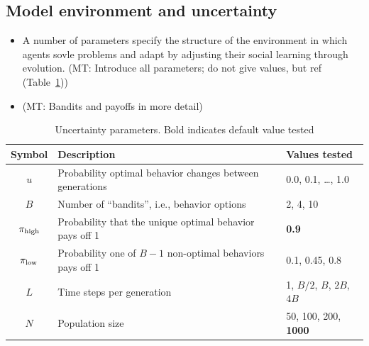 \documentclass[letterpaper,11.5pt]{scrartcl}
\newcommand{\mt}[1]{{\textcolor{myorange} {({\tiny MT:} #1)}}}
\begin{document}
\subsection{Model environment and uncertainty}




\begin{itemize}
  \item 
    A number of parameters specify the structure of the environment in which
    agents sovle problems and adapt by adjusting their social learning through
    evolution. \mt{Introduce all parameters; do not give values, but ref
    (Table~\ref{tab:uncertaintyParameters})}
  \item
    \mt{Bandits and payoffs in more detail}
\end{itemize}

\vspace{2em}
\begin{table}[h]
\caption{Uncertainty parameters.  Bold indicates default value tested} %
    \label{tab:uncertaintyParameters}
    \centering %
    \begin{tabular}{cp{4.0in}p{1.25in}} \toprule

        Symbol & Description & Values tested \\ 

        \midrule  

        $u$    & Probability optimal behavior changes between generations 
               & 0.0, 0.1, \ldots, 1.0 \\

        $B$       & Number of ``bandits'', i.e., behavior options
                  & 2, 4, 10 \\

        $\pi_{\mathrm{high}}$ & Probability that the unique optimal behavior pays off 1 
                & \textbf{0.9} \\

        $\pi_{\mathrm{low}}$ & Probability one of $B - 1$ non-optimal behaviors pays off 1 
                 & 0.1, 0.45, 0.8 \\ 

        $L$    & Time steps per generation & 1, $B/2$, $B$, $2B$, $4B$ \\

        $N$    & Population size
                 & 50, 100, 200, \textbf{1000} \\
               
        \bottomrule
        \end{tabular} 
\end{table}
\end{document}
